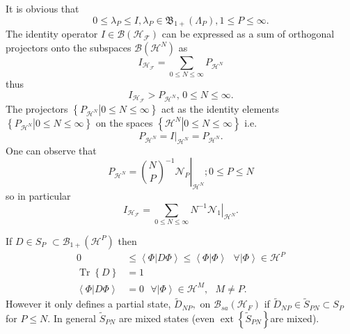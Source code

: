 \documentclass[aps,preprint]{revtex4}%
\begin{document}
It is obvious that
\begin{equation}
0\leq\lambda_{P}\leq I,\lambda_{P}\in\mathfrak{B}_{1+}\left(  \Lambda
_{P}\right)  ,1\leq P\leq\infty.
\end{equation}
The identity operator $I\in\mathcal{B}\left(  \mathcal{H}_{\mathcal{F}%
}\right)  $ can be expressed as a sum of orthogonal projectors onto the
subspaces $\mathcal{B}\left(  \mathcal{H}^{N}\right)  $ as%
\begin{equation}
I_{\mathcal{H}_{\mathcal{F}}}=\sum_{0\leq N\leq\infty}P_{\mathcal{H}^{N}}%
\end{equation}
thus
\begin{equation}
I_{\mathcal{H}_{\mathcal{F}}}>P_{\mathcal{H}^{N}},\,0\leq N\leq\infty.
\end{equation}
The projectors $\left\{  \left.  P_{\mathcal{H}^{N}}\right\vert 0\leq
N\leq\infty\right\}  $ act as the identity elements $\left\{  \left.
P_{\mathcal{H}^{N}}\right\vert 0\leq N\leq\infty\right\}  $ on the spaces
$\left\{  \left.  \mathcal{H}^{N}\right\vert 0\leq N\leq\infty\right\}  $ i.e.%
\begin{equation}
P_{\mathcal{H}^{N}}=\left.  I\right\vert _{\mathcal{H}^{N}}=P_{\mathcal{H}%
^{N}}.
\end{equation}
One can observe that
\begin{equation}
P_{\mathcal{H}^{N}}=\left.  \binom{N}{P}^{-1}\mathcal{N}_{P}\right\vert
_{\mathcal{H}^{N}};0\leq P\leq N
\end{equation}
so in particular
\begin{equation}
I_{\mathcal{H}_{\mathcal{F}}}=\sum_{0\leq N\leq\infty}\left.  N^{-1}%
\mathcal{N}_{1}\right\vert _{\mathcal{H}^{N}}.
\end{equation}


If $D\in S_{P}$ $\subset\mathcal{B}_{1+}\left(  \mathcal{H}^{P}\right)  $
then
\begin{align}
0  &  \leq\left\langle \left.  \Phi\right\vert D\Phi\right\rangle
\leq\left\langle \left.  \Phi\right\vert \Phi\right\rangle \text{ }%
\forall\left\vert \Phi\right\rangle \in\mathcal{H}^{P}\\
\operatorname{Tr}\left\{  D\right\}   &  =1\\
\left\langle \left.  \Phi\right\vert D\Phi\right\rangle  &  =0\text{ }%
\forall\left\vert \Phi\right\rangle \in\mathcal{H}^{M},\text{ }M\neq P.
\end{align}
However it only defines a partial state, $\tilde{D}_{NP},$ on $\mathcal{B}%
_{sa}\left(  \mathcal{H}_{F}\right)  $ if $\tilde{D}_{NP}\in\tilde{S}%
_{PN}\subset S_{P}$ for $P\leq N.$ In general $\tilde{S}_{PN}$ are mixed
states (even $\operatorname*{ext}\left\{  \tilde{S}_{PN}\right\}  $are
mixed)$.$
\end{document}

